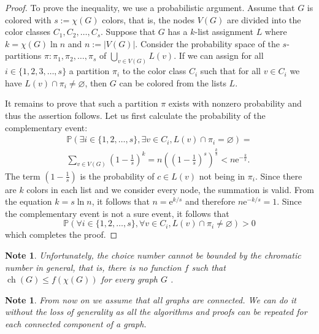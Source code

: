 \documentclass[a4paper, 12pt]{article}
\newtheorem{note}[lem]{Note}
\DeclareMathOperator*{\ch}{ch}
\begin{document}
\begin{proof} To prove the inequality, we use a probabilistic argument. Assume that $G$ is colored with $s := \chi(G)$ colors, that is, the nodes $V(G)$ are divided into the color classes $C_1, C_2, \ldots, C_s$. Suppose that $G$ has a $k$-list assignment $L$ where $k = \chi(G) \ln{n}$ and $n := |V(G)|.$ Consider the probability space of the $s$-partitions $\pi \colon \pi_{1},\pi_{2},\ldots,\pi_{s}$ of $\bigcup_{v \in V(G)} L(v).$ If we can assign for all $i \in \lbrace 1,2,3,\dots,s \rbrace$ a partition $\pi_i$ to the color class $C_i$ such that for all $v \in C_i$ we have $L(v) \cap \pi_i \neq \varnothing$, then $G$ can be colored from the lists $L$. 

It remains to prove that such a partition $\pi$ exists with nonzero probability and thus the assertion follows. Let us first calculate the probability of the complementary event:
\begin{equation*}
\begin{split}
\mathbb{P}(\exists i \in \lbrace 1,2,\ldots, s \rbrace, \exists v \in C_i, L(v) \cap \pi_i = \varnothing) = \\
\sum_{v \in V(G)}\left( 1 - \frac{1}{s} \right)^k = n \left(\left(1 - \frac{1}{s} \right)^s \right)^{\frac{k}{s}} < n\mathrm{e}^{-\frac{k}{s}}.
\end{split}
\end{equation*}
The term $\left( 1 - \frac{1}{s} \right)$ is the probability of $c \in L(v)$ not being in $\pi_i.$ Since there are $k$ colors in each list and we consider every node, the summation is valid. From the equation $k = s \ln{n}$, it follows that $n = \mathrm{e}^{k/s}$ and therefore $n\mathrm{e}^{-k/s} = 1.$ Since the complementary event is not a sure event, it follows that
$$
\mathbb{P}(\forall i \in \lbrace 1,2,\ldots, s \rbrace, \forall v \in C_i, L(v) \cap \pi_i \neq \varnothing) > 0
$$
which completes the proof.
\end{proof}
\begin{note} Unfortunately, the choice number cannot be bounded by the chromatic number in general, that is, there is no function $f$ such that $\ch(G) \leqslant f(\chi(G))$ for every graph $G$ \cite{GRAVIER1996299}.
\end{note}
\begin{note}From now on we assume that all graphs are connected. We can do it without the loss of generality as all the algorithms and proofs can be repeated for each connected component of a graph.\end{note}
\end{document}
